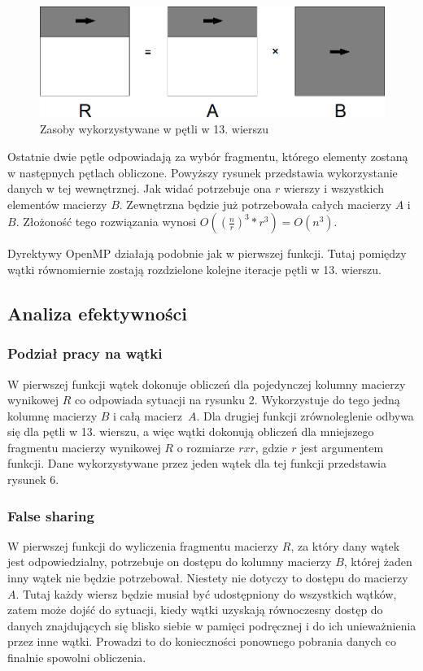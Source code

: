 \documentclass{article}
\begin{document}
\begin{figure}[H]
	\centering
	\includegraphics[width=\linewidth]{./images/6/lokOut1.png}
	\caption{Zasoby wykorzystywane w pętli w 13. wierszu}
	\label{fig:6outer1}
\end{figure}

Ostatnie dwie pętle odpowiadają za wybór fragmentu, którego elementy zostaną w następnych pętlach obliczone. Powyższy rysunek przedstawia wykorzystanie danych w tej wewnętrznej. Jak widać potrzebuje ona $r$ wierszy i wszystkich elementów macierzy $B$. Zewnętrzna będzie już potrzebowała całych macierzy $A$ i $B$. Złożoność tego rozwiązania wynosi $O((\frac{n}{r})^3*r^3)=O(n^3)$.

Dyrektywy OpenMP działają podobnie jak w pierwszej funkcji. Tutaj pomiędzy wątki równomiernie zostają rozdzielone kolejne iteracje pętli w 13. wierszu.

\subsection{Analiza efektywności}
\subsubsection{Podział pracy na wątki}

W pierwszej funkcji wątek dokonuje obliczeń dla pojedynczej kolumny macierzy wynikowej $R$ co odpowiada sytuacji na rysunku 2. Wykorzystuje do tego jedną kolumnę macierzy $B$ i całą macierz~$A$. Dla drugiej funkcji zrównoleglenie odbywa się dla pętli w 13. wierszu, a więc wątki dokonują obliczeń dla mniejszego fragmentu macierzy wynikowej $R$ o rozmiarze $r x r$, gdzie $r$ jest argumentem funkcji. Dane wykorzystywane przez jeden wątek dla tej funkcji przedstawia rysunek 6.

\subsubsection{False sharing}

W pierwszej funkcji do wyliczenia fragmentu macierzy $R$, za który dany wątek jest odpowiedzialny, potrzebuje on dostępu do kolumny macierzy $B$, której żaden inny wątek nie będzie potrzebował. Niestety nie dotyczy to dostępu do macierzy $A$. Tutaj każdy wiersz będzie musiał być udostępniony do wszystkich wątków, zatem może dojść do sytuacji, kiedy wątki uzyskają równoczesny dostęp do danych znajdujących się blisko siebie w pamięci podręcznej i do ich unieważnienia przez inne wątki. Prowadzi to do konieczności ponownego pobrania danych co finalnie spowolni obliczenia.
\end{document}
